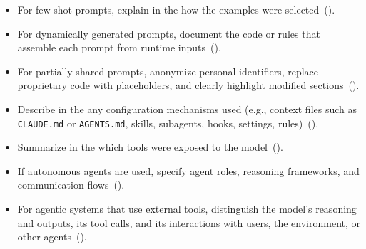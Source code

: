 \begin{itemize}[label={},leftmargin=*]
    \item \iconM {} For few-shot prompts, explain in the \paper how the examples were selected~().
    \item \iconM {} For dynamically generated prompts, document the code or rules that assemble each prompt from runtime inputs~().
    \item \iconM {} For partially shared prompts, anonymize personal identifiers, replace proprietary code with placeholders, and clearly highlight modified sections~().
    \item \iconM {} Describe in the \paper any configuration mechanisms used (e.g., context files such as \texttt{CLAUDE.md} or \texttt{AGENTS.md}, skills, subagents, hooks, settings, rules)~().
    \item \iconM {} Summarize in the \paper which tools were exposed to the model~().
    \item \iconM {} If autonomous agents are used, specify agent roles, reasoning frameworks, and communication flows~().
    \item \iconM {} For agentic systems that use external tools, distinguish the model's reasoning and outputs, its tool calls, and its interactions with users, the environment, or other agents~().

\end{itemize}
